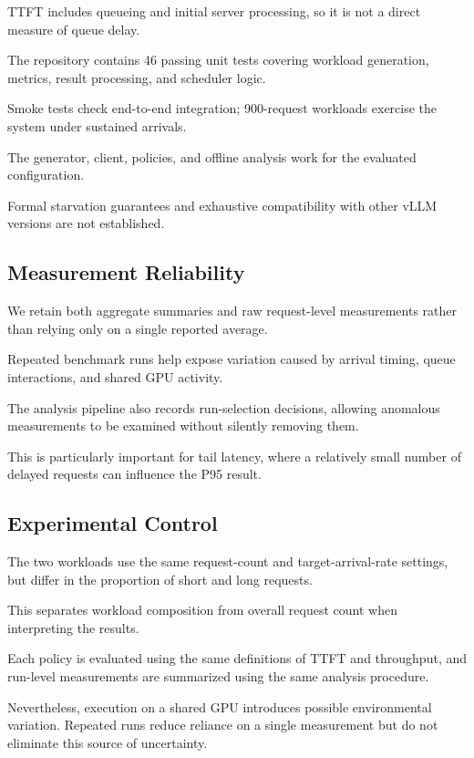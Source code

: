 \documentclass[sigplan,nonacm]{acmart}
\begin{document}
TTFT includes queueing and initial server
processing, so it is not a direct measure
of queue delay.

The repository contains 46 passing unit tests
covering workload generation, metrics,
result processing, and scheduler logic.

Smoke tests check end-to-end integration;
900-request workloads exercise the system
under sustained arrivals.

The generator, client, policies, and offline
analysis work for the evaluated configuration.

Formal starvation guarantees and exhaustive
compatibility with other vLLM versions
are not established.

\subsection{Measurement Reliability}

We retain both aggregate summaries and raw
request-level measurements rather than relying
only on a single reported average.

Repeated benchmark runs help expose variation
caused by arrival timing, queue interactions,
and shared GPU activity.

The analysis pipeline also records run-selection
decisions, allowing anomalous measurements
to be examined without silently removing them.

This is particularly important for tail latency,
where a relatively small number of delayed
requests can influence the P95 result.

\subsection{Experimental Control}

The two workloads use the same request-count
and target-arrival-rate settings, but differ
in the proportion of short and long requests.

This separates workload composition from
overall request count when interpreting the
results.

Each policy is evaluated using the same
definitions of TTFT and throughput, and
run-level measurements are summarized using
the same analysis procedure.

Nevertheless, execution on a shared GPU
introduces possible environmental variation.
Repeated runs reduce reliance on a single
measurement but do not eliminate this
source of uncertainty.
\end{document}
